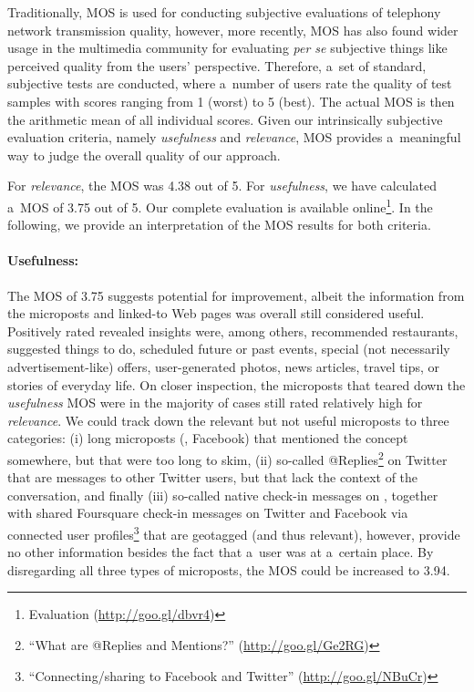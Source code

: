Traditionally, MOS is used for conducting subjective evaluations
of telephony network transmission quality,
however, more recently, MOS has also found wider usage in the multimedia community
for evaluating \emph{per se} subjective things
like perceived quality from the users' perspective. 
Therefore, a~set of standard, subjective tests are conducted,
where a~number of users rate the quality of test samples
with scores ranging from 1 (worst) to 5 (best).
The actual MOS is then the arithmetic mean of all individual scores.
Given our intrinsically subjective evaluation criteria,
namely \emph{usefulness} and \emph{relevance},
MOS provides a~meaningful way to judge the overall quality of our approach.

For \emph{relevance}, the MOS was 4.38 out of 5.
For \emph{usefulness}, we have calculated a~MOS of 3.75 out of 5.
Our complete evaluation is available online\footnote{Evaluation (\url{http://goo.gl/dbvr4})}.
In the following, we provide an interpretation of the MOS results for both criteria.

\paragraph{Usefulness:}
The MOS of 3.75 suggests potential for improvement,
albeit the information from the microposts and linked-to Web pages
was overall still considered useful.
Positively rated revealed insights were, among others, recommended restaurants,
suggested things to do, scheduled future or past events,
special (not necessarily advertisement-like) offers, user-generated photos,
news articles, travel tips, or stories of everyday life.
On closer inspection, the microposts that teared down the \emph{usefulness} MOS
were in the majority of cases still rated relatively high for \emph{relevance}.
We could track down the relevant but not useful microposts to three categories:
(i) long microposts (\googleplus, Facebook) that mentioned the concept somewhere,
but that were too long to skim,
(ii) so-called
@Replies\footnote{``What are @Replies and Mentions?'' (\url{http://goo.gl/Ge2RG})}
on Twitter that are messages to other Twitter users,
but that lack the context of the conversation, and finally
(iii) so-called native check-in messages on \googleplus,
together with shared Foursquare check-in messages on Twitter and Facebook
via connected user profiles\footnote{``Connecting/sharing to Facebook and Twitter'' (\url{http://goo.gl/NBuCr})}
that are geotagged (and thus relevant), however,
provide no other information besides the fact that a~user was at a~certain place.
By disregarding all three types of microposts, the MOS could be increased to 3.94.

